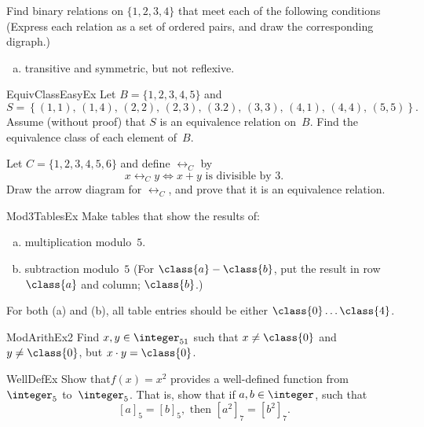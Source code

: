 \begin{exer} \label{BinRelSomePropsEx}
Find binary relations on $\{1,2,3,4\}$ that meet each of the following conditions 
(Express each relation as a set of ordered pairs, and draw the corresponding digraph.)
\begin{enumerate}[(a)]
\item \label{BinRelSomePropsEx-transandsymm}
transitive and symmetric, but not reflexive.
\end{enumerate}
\end{exer}

\begin{exercise}{EquivClassEasyEx}
Let $B = \{1,2,3,4,5\}$ and 
	$$S = \left\{ (1,1),\, (1,4),\, (2,2),\, (2,3),\, (3.2),\, 
		(3,3),\, (4,1),\, (4,4),\, (5,5)
		 \right\} .$$
Assume (without proof) that $S$ is an equivalence relation on~$B$. Find the equivalence class of each element of~$B$.
\end{exercise}

\begin{exercise}{}
Let $C = \{1,2,3,4,5,6\}$ and define $\rel_C$ by 
\[ x \rel_C y \iff x + y \text{ is divisible by 3.} \]
Draw the arrow diagram for $\rel_C$, and prove that it is an equivalence relation.
\end{exercise}

\begin{exercise}{Mod3TablesEx}
Make tables that show the results of:
\begin{enumerate}[(a)]
\item \label{Mod3TablesEx-multiplication}
multiplication modulo~$5$.
\item \label{Mod3TablesEx-subtraction}
subtraction modulo~$5$ (For $\class{a} - \class{b}$,  put the result in row $\class{a}$ and column; $\class{b}$.)
\end{enumerate}
For both (a) and (b), all table entries should be  either $\class{0} \ldots \class{4}$.
\end{exercise}

\begin{exercise}{ModArithEx2}  
Find $x,y \in \integer_{51}$ such that $x \neq \class{0}$ and $y \neq \class{0}$, but $x \cdot y = \class{0}$.
\end{exercise}

\begin{exercise}{WellDefEx}
 Show that$f(x)=x^2$ provides a well-defined function from~$\integer_5$ to~$\integer_5$. That is, show that if $a,b \in \integer$, such that 
\[ [a]_5 = [b]_5, \text{ then } [ a^2]_7 = [ b^2]_7.\]
\end{exercise}

